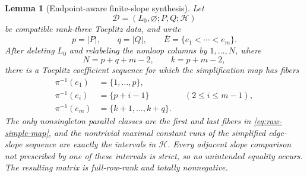 \documentclass{amsart}
\numberwithin{equation}{section}
\newtheorem{lemma}[theorem]{Lemma}
\theoremstyle{definition}
\theoremstyle{remark}
\begin{document}
\begin{lemma}[Endpoint-aware finite-slope synthesis]\label{lem:endpoint-aware-synthesis}
Let
\[
 \mathcal D=(L_0,\varnothing;P,Q;\mathcal H)
\]
be compatible rank-three Toeplitz data, and write
\[
 p=|P|,\qquad q=|Q|,\qquad
 \overline E=\{e_1<\cdots<e_m\}.
\]
After deleting $L_0$ and relabeling the nonloop columns by $1,\ldots,N$, where
\[
 N=p+q+m-2,
 \qquad
 k=p+m-2,
\]
there is a Toeplitz coefficient sequence for which the simplification map has fibers
\begin{equation}\label{eq:raw-simple-map}
\begin{aligned}
 \pi^{-1}(e_1)&=\{1,\ldots,p\},\\
 \pi^{-1}(e_i)&=\{p+i-1\} &&(2\le i\le m-1),\\
 \pi^{-1}(e_m)&=\{k+1,\ldots,k+q\}.
\end{aligned}
\end{equation}
The only nonsingleton parallel classes are the first and last fibers in \eqref{eq:raw-simple-map}, and the nontrivial maximal constant runs of the simplified edge-slope sequence are exactly the intervals in $\mathcal H$.  Every adjacent slope comparison not prescribed by one of these intervals is strict, so no unintended equality occurs.  The resulting matrix is full-row-rank and totally nonnegative.
\end{lemma}
\end{document}
